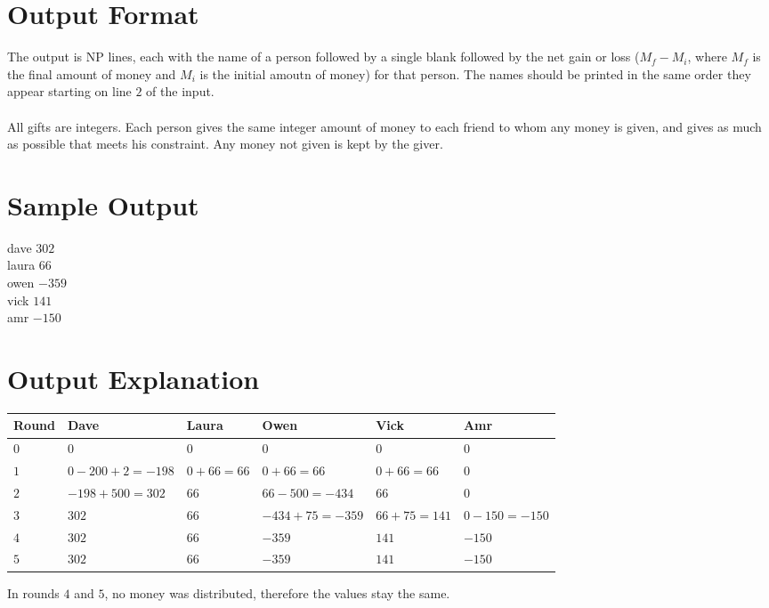 \documentclass{article}
\begin{document}
\section*{Output Format}
The output is NP lines, each with the name of a person followed by a single blank followed by the net gain or loss ($M_f-M_i$, where $M_f$ is the final amount of money and $M_i$ is the initial amoutn of money) for that person. The names should be printed in the same order they appear starting on line $2$ of the input.\\\\
All gifts are integers. Each person gives the same integer amount of money to each friend to whom any money is given, and gives as much as possible that meets his constraint. Any money not given is kept by the giver.
\section*{Sample Output}
dave $302$\\
laura $66$\\
owen $-359$\\
vick $141$\\
amr $-150$
\section*{Output Explanation}
\begin{tabular}{ | m{2cm} | m{2cm} | m{2cm} | m{2cm} | m{2cm} | m{2cm} | }
\hline
\textbf{Round}&\textbf{Dave}&\textbf{Laura}&\textbf{Owen}&\textbf{Vick}&\textbf{Amr}\\
\hline
\cellcolor{blue!25}$0$&$0$&$0$&$0$&$0$&$0$\\
\hline
\hline
\cellcolor{green!25}$1$&$0-200+2=-198$&$0+66=66$&$0+66=66$&$0+66=66$&$0$\\
\hline
\hline
\cellcolor{red!25}$2$&$-198+500=302$&$66$&$66-500=-434$&$66$&$0$\\
\hline
\hline
\cellcolor{yellow!25}$3$&$302$&$66$&$-434+75=-359$&$66+75=141$&$0-150=-150$\\
\hline
\hline
\cellcolor{orange!25}$4$&$302$&$66$&$-359$&$141$&$-150$\\
\hline
\hline
\cellcolor{purple!25}$5$&$302$&$66$&$-359$&$141$&$-150$\\
\hline
\end{tabular}
\linebreak
\linebreak
In rounds $4$ and $5$, no money was distributed, therefore the values stay the same.
\end{document}
